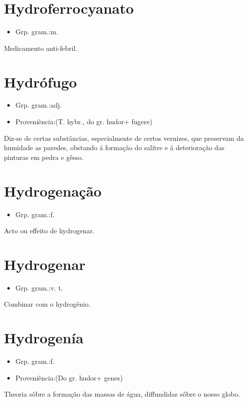 \documentclass{article}
\begin{document}
\section{Hydroferrocyanato}
\begin{itemize}
\item {Grp. gram.:m.}
\end{itemize}
Medicamento anti-febril.
\section{Hydrófugo}
\begin{itemize}
\item {Grp. gram.:adj.}
\end{itemize}
\begin{itemize}
\item {Proveniência:(T. hybr., do gr. \textunderscore hudor\textunderscore  + \textunderscore fugere\textunderscore )}
\end{itemize}
Diz-se de certas substâncias, especialmente de certos vernizes, que preservam da humidade as paredes, obstando á formação do salitre e á deterioração das pinturas em pedra e gêsso.
\section{Hydrogenação}
\begin{itemize}
\item {Grp. gram.:f.}
\end{itemize}
Acto ou effeito de hydrogenar.
\section{Hydrogenar}
\begin{itemize}
\item {Grp. gram.:v. t.}
\end{itemize}
Combinar com o hydrogênio.
\section{Hydrogenía}
\begin{itemize}
\item {Grp. gram.:f.}
\end{itemize}
\begin{itemize}
\item {Proveniência:(Do gr. \textunderscore hudor\textunderscore  + \textunderscore genes\textunderscore )}
\end{itemize}
Theoria sôbre a formação das massas de água, diffundidas sôbre o nosso globo.
\end{document}
